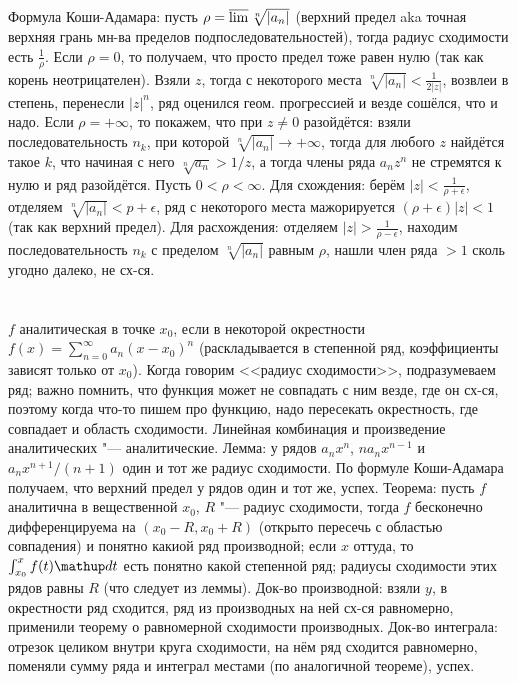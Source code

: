 \section{} %
Формула Коши-Адамара: пусть $\rho=\varlimsup\sqrt[n]{|a_n|}$ (верхний предел aka точная верхняя грань мн-ва пределов подпоследовательностей), тогда радиус сходимости есть $\frac1\rho$.
Если $\rho=0$, то получаем, что просто предел тоже равен нулю (так как корень неотрицателен).
Взяли $z$, тогда с некоторого места $\sqrt[n]{|a_n|} < \frac{1}{2|z|}$, возвлеи в степень, перенесли $|z|^n$, ряд оценился геом. прогрессией и везде сошёлся, что и надо.
Если $\rho=+\infty$, то покажем, что при $z \neq 0$ разойдётся: взяли последовательность $n_k$, при которой $\sqrt[n]{|a_n|} \to +\infty$, тогда для любого
$z$ найдётся такое $k$, что начиная с него $\sqrt[n]{a_n} > 1/z$, а тогда члены ряда $a_nz^n$ не стремятся к нулю и ряд разойдётся.
Пусть $0<\rho < \infty$.
Для схождения: берём $|z|<\frac{1}{\rho+\epsilon}$, отделяем $\sqrt[n]{|a_n|}<p+\epsilon$, ряд с некоторого места мажорируется $(\rho + \epsilon)|z|<1$ (так как верхний предел).
Для расхождения: отделяем $|z|>\frac{1}{\rho-\epsilon}$, находим последовательность $n_k$ с пределом $\sqrt[n]{|a_n|}$ равным $\rho$, нашли член ряда $>1$ сколь угодно далеко, не сх-ся.

\section{} %
$f$ аналитическая в точке $x_0$, если в некоторой окрестности $f(x)=\sum_{n=0}^\infty a_n(x-x_0)^n$ (раскладывается в степенной ряд,
коэффициенты зависят только от $x_0$).
Когда говорим <<радиус сходимости>>, подразумеваем ряд; важно помнить, что функция может не совпадать с ним везде, где он сх-ся,
поэтому когда что-то пишем про функцию, надо пересекать окрестность, где совпадает и область сходимости.
Линейная комбинация и произведение аналитических "--- аналитические.
Лемма: у рядов $a_nx^n$, $na_nx^{n-1}$ и $a_nx^{n+1}/(n+1)$ один и тот же радиус сходимости.
По формуле Коши-Адамара получаем, что верхний предел у рядов один и тот же, успех.
Теорема: пусть $f$ аналитична в вещественной $x_0$, $R$ "--- радиус сходимости, тогда $f$ бесконечно дифференцируема на $(x_0-R, x_0+R)$ (открыто пересечь с областью совпадения)
и понятно какиой ряд производной; если $x$ оттуда, то $\int_{x_0}^x f(t) \d t$ есть понятно какой степенной ряд; радиусы сходимости этих рядов равны $R$ (что следует из леммы).
Док-во производной: взяли $y$, в окрестности ряд сходится, ряд из производных на ней сх-ся равномерно, применили теорему о равномерной сходимости производных.
Док-во интеграла: отрезок целиком внутри круга сходимости, на нём ряд сходится равномерно, поменяли сумму ряда и интеграл местами (по аналогичной теореме), успех.


